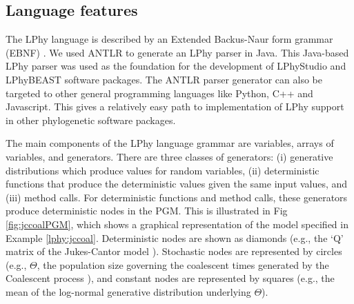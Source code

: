 \documentclass[10pt,letterpaper,table]{article}
\theoremstyle{definition}
\begin{document}
\subsection{Language features}
The LPhy language is described by an Extended Backus-Naur form grammar (EBNF) \cite{ebnf}. 
We used ANTLR \cite{parr1995antlr,parr2013definitive} to generate an LPhy parser in Java. 
This Java-based LPhy parser was used as the foundation for the development of LPhyStudio and LPhyBEAST software packages. 
The ANTLR parser generator can also be targeted to other general programming languages like Python, C++ and Javascript. 
This gives a relatively easy path to implementation of LPhy support in other phylogenetic software packages.

The main components of the LPhy language grammar are variables, arrays of variables, and generators. 
There are three classes of generators: (i) generative distributions which produce values for random variables, (ii) deterministic functions that produce the deterministic values given the same input values, and (iii) method calls.
For deterministic functions and method calls, these generators produce deterministic nodes in the PGM.
This is illustrated in Fig \ref{fig:jccoalPGM}, which shows a graphical representation of the model specified in Example \ref{lphy:jccoal}.
Deterministic nodes are shown as diamonds (e.g., the `Q' matrix of the Jukes-Cantor model \cite{jc69}).
Stochastic nodes are represented by circles (e.g., $\Theta$, the population size governing the coalescent times generated by the Coalescent process \cite{kingman82}), and constant nodes are represented by squares (e.g., the mean of the log-normal generative distribution underlying $\Theta$). 
\end{document}
